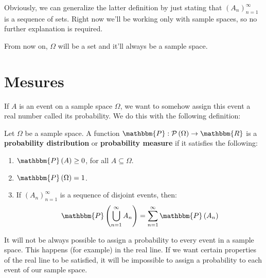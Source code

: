 \documentclass[12pt]{report}
\theoremstyle{largebreak}
\newcommand\cf[3]{\ensuremath{#1:#2\rightarrow#3}}
\newcommand{\bbm}[1]{\mathbbm{#1}}
\newcommand{\pot}[1]{\mathcal{P}\left(#1\right)}
\newcommand{\Prob}[1]{\mathbbm{P}\left(#1\right)}
\begin{document}
    Obviously, we can generalize the latter definition by just stating that $\left(A_n\right)_{ n=1}^\infty$ is a sequence of sets. Right now we'll be working only with sample spaces, so no further explanation is required.

    From now on, $\Omega$ will be a set and it'll always be a sample space.

    \section{Mesures}

    If $A$ is an event on a sample space $\Omega$, we want to somehow assign this event a real number called its probability. We do this with the following definition:

    \begin{mydef}
        Let $\Omega$ be a sample space. A function $\cf{\bbm{P}}{\pot{\Omega}}{\bbm{R}}$ is a \textbf{probability distribution} or \textbf{probability measure} if it satisfies the following:
        \begin{enumerate}[label = \textit{(\arabic*)}]
            \item $\Prob{A}\geq 0$, for all $A\subseteq\Omega$.
            \item $\Prob{\Omega}=1$.
            \item If $\left(A_n\right)_{ n=1}^\infty$ is a sequence of disjoint events, then:
            \begin{equation*}
                \Prob{\bigcup_{ n=1}^\infty A_n}=\sum_{ n=1}^\infty\Prob{A_n}
            \end{equation*}
        \end{enumerate}
    \end{mydef}

    \begin{obs}
        It will not be always possible to assign a probability to every event in a sample space. This happens (for example) in the real line. If we want certain properties of the real line to be satisfied, it will be impossible to assign a probability to each event of our sample space.
    \end{obs}
\end{document}

